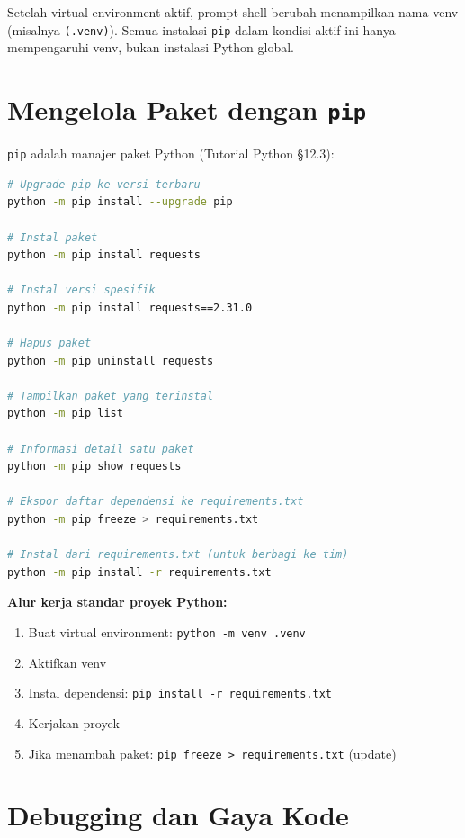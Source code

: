 \documentclass[../main.tex]{subfiles}
\begin{document}
\begin{catatan}
Setelah virtual environment aktif, prompt shell berubah menampilkan nama venv (misalnya \texttt{(.venv)}). Semua instalasi \texttt{pip} dalam kondisi aktif ini hanya mempengaruhi venv, bukan instalasi Python global.
\end{catatan}

\section{Mengelola Paket dengan \texttt{pip}}

\texttt{pip} adalah manajer paket Python (Tutorial Python §12.3):

\begin{lstlisting}[language=bash,caption=Perintah pip yang umum]
# Upgrade pip ke versi terbaru
python -m pip install --upgrade pip

# Instal paket
python -m pip install requests

# Instal versi spesifik
python -m pip install requests==2.31.0

# Hapus paket
python -m pip uninstall requests

# Tampilkan paket yang terinstal
python -m pip list

# Informasi detail satu paket
python -m pip show requests

# Ekspor daftar dependensi ke requirements.txt
python -m pip freeze > requirements.txt

# Instal dari requirements.txt (untuk berbagi ke tim)
python -m pip install -r requirements.txt
\end{lstlisting}

\begin{konsep}
\textbf{Alur kerja standar proyek Python:}
\begin{enumerate}[leftmargin=*]
  \item Buat virtual environment: \texttt{python -m venv .venv}
  \item Aktifkan venv
  \item Instal dependensi: \texttt{pip install -r requirements.txt}
  \item Kerjakan proyek
  \item Jika menambah paket: \texttt{pip freeze > requirements.txt} (update)
\end{enumerate}
\end{konsep}

\section{Debugging dan Gaya Kode}
\end{document}
